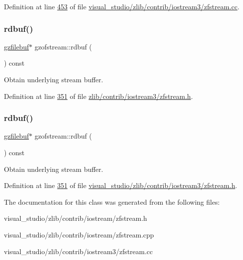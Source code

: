 Definition at line \hyperlink{visual__studio_2zlib_2contrib_2iostream3_2zfstream_8cc_source_l00453}{453} of file \hyperlink{visual__studio_2zlib_2contrib_2iostream3_2zfstream_8cc_source}{visual\+\_\+studio/zlib/contrib/iostream3/zfstream.\+cc}.

\mbox{\label{classgzofstream_a2fef74202b114357f41cfeb28f1d2acc}} 
\subsubsection{\texorpdfstring{rdbuf()}{rdbuf()}\hspace{0.1cm}{\footnotesize\ttfamily [1/2]}}
{\footnotesize\ttfamily \hyperlink{classgzfilebuf}{gzfilebuf}$\ast$ gzofstream\+::rdbuf (\begin{DoxyParamCaption}{ }\end{DoxyParamCaption}) const\hspace{0.3cm}{\ttfamily [inline]}}

Obtain underlying stream buffer. 

Definition at line \hyperlink{zlib_2contrib_2iostream3_2zfstream_8h_source_l00351}{351} of file \hyperlink{zlib_2contrib_2iostream3_2zfstream_8h_source}{zlib/contrib/iostream3/zfstream.\+h}.

\mbox{\label{classgzofstream_a2fef74202b114357f41cfeb28f1d2acc}} 
\subsubsection{\texorpdfstring{rdbuf()}{rdbuf()}\hspace{0.1cm}{\footnotesize\ttfamily [2/2]}}
{\footnotesize\ttfamily \hyperlink{classgzfilebuf}{gzfilebuf}$\ast$ gzofstream\+::rdbuf (\begin{DoxyParamCaption}{ }\end{DoxyParamCaption}) const\hspace{0.3cm}{\ttfamily [inline]}}

Obtain underlying stream buffer. 

Definition at line \hyperlink{visual__studio_2zlib_2contrib_2iostream3_2zfstream_8h_source_l00351}{351} of file \hyperlink{visual__studio_2zlib_2contrib_2iostream3_2zfstream_8h_source}{visual\+\_\+studio/zlib/contrib/iostream3/zfstream.\+h}.



The documentation for this class was generated from the following files\+:\begin{DoxyCompactItemize}
\item 
visual\+\_\+studio/zlib/contrib/iostream/zfstream.\+h\item 
visual\+\_\+studio/zlib/contrib/iostream/zfstream.\+cpp\item 
visual\+\_\+studio/zlib/contrib/iostream3/zfstream.\+cc\end{DoxyCompactItemize}
